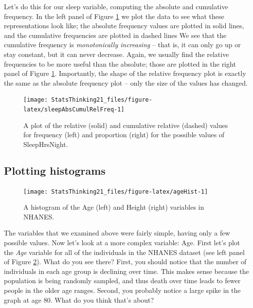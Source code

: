 \documentclass[
  12pt,
]{book}
\begin{document}
Let's do this for our sleep variable, computing the absolute and cumulative frequency. In the left panel of Figure \ref{fig:sleepAbsCumulRelFreq} we plot the data to see what these representations look like; the absolute frequency values are plotted in solid lines, and the cumulative frequencies are plotted in dashed lines We see that the cumulative frequency is \emph{monotonically increasing} -- that is, it can only go up or stay constant, but it can never decrease. Again, we usually find the relative frequencies to be more useful than the absolute; those are plotted in the right panel of Figure \ref{fig:sleepAbsCumulRelFreq}. Importantly, the shape of the relative frequency plot is exactly the same as the absolute frequency plot -- only the size of the values has changed.

\begin{figure}
\texttt{[image: StatsThinking21\_files/figure-latex/sleepAbsCumulRelFreq-1]} \caption{A plot of the relative (solid) and cumulative relative (dashed) values for frequency (left) and proportion (right) for the possible values of SleepHrsNight.}\label{fig:sleepAbsCumulRelFreq}
\end{figure}

\hypertarget{plotting-histograms}{%
\subsection{Plotting histograms}\label{plotting-histograms}}

\begin{figure}
\texttt{[image: StatsThinking21\_files/figure-latex/ageHist-1]} \caption{A histogram of the Age (left) and Height (right) variables in NHANES.}\label{fig:ageHist}
\end{figure}

The variables that we examined above were fairly simple, having only a few possible values. Now let's look at a more complex variable: Age. First let's plot the \emph{Age} variable for all of the individuals in the NHANES dataset (see left panel of Figure \ref{fig:ageHist}). What do you see there? First, you should notice that the number of individuals in each age group is declining over time. This makes sense because the population is being randomly sampled, and thus death over time leads to fewer people in the older age ranges. Second, you probably notice a large spike in the graph at age 80. What do you think that's about?
\end{document}
